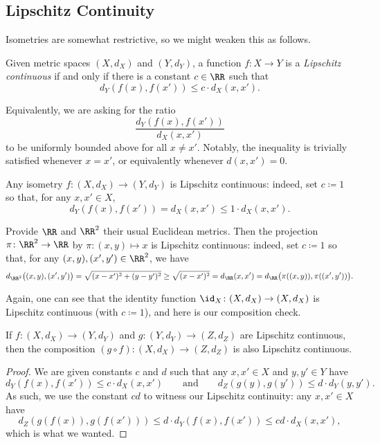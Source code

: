 \documentclass[../notes.tex]{subfiles}
\begin{document}
\subsection{Lipschitz Continuity}
Isometries are somewhat restrictive, so we might weaken this as follows.
\begin{defihelper} \label{defi:lipcont} 
	Given metric spaces $(X,d_X)$ and $(Y,d_Y)$, a function $f\colon X\to Y$ is a \textit{Lipschitz continuous} if and only if there is a constant $c\in\RR$ such that
	\[d_Y(f(x),f(x'))\le c\cdot d_X(x,x').\]
\end{defihelper}
\begin{remark} \label{rem:lipasratio}
	Equivalently, we are asking for the ratio
	\[\frac{d_Y(f(x),f(x'))}{d_X(x,x')}\]
	to be uniformly bounded above for all $x\ne x'$. Notably, the inequality is trivially satisfied whenever $x=x'$, or equivalently whenever $d(x,x')=0$.
\end{remark}
\begin{example}
	Any isometry $f\colon(X,d_X)\to(Y,d_Y)$ is Lipschitz continuous: indeed, set $c\coloneqq1$ so that, for any $x,x'\in X$,
	\[d_Y(f(x),f(x'))=d_X(x,x')\le1\cdot d_X(x,x').\]
\end{example}
\begin{example} \label{ex:projectislip}
	Provide $\RR$ and $\RR^2$ their usual Euclidean metrics. Then the projection $\pi\colon\RR^2\to\RR$ by $\pi\colon(x,y)\mapsto x$ is Lipschitz continuous: indeed, set $c\coloneqq1$ so that, for any $(x,y),(x',y')\in\RR^2$, we have
	\[d_{\RR^2}\big((x,y),(x',y')\big)=\sqrt{(x-x')^2+(y-y')^2}\ge\sqrt{(x-x')^2}=d_\RR(x,x')=d_\RR\big(\pi((x,y)),\pi((x',y'))\big).\]
\end{example}
Again, one can see that the identity function ${\id_X}\colon(X,d_X)\to(X,d_X)$ is Lipschitz continuous (with $c\coloneqq1$), and here is our composition check.
\begin{lemma}
	If $f\colon(X,d_X)\to(Y,d_Y)$ and $g\colon(Y,d_Y)\to(Z,d_Z)$ are Lipschitz continuous, then the composition $(g\circ f)\colon(X,d_X)\to(Z,d_Z)$ is also Lipschitz continuous.
\end{lemma}
\begin{proof}
	We are given constants $c$ and $d$ such that any $x,x'\in X$ and $y,y'\in Y$ have
	\[d_Y(f(x),f(x'))\le c\cdot d_X(x,x')\qquad\text{and}\qquad d_Z(g(y),g(y'))\le d\cdot d_Y(y,y').\]
	As such, we use the constant $cd$ to witness our Lipschitz continuity: any $x,x'\in X$ have
	\[d_Z(g(f(x)),g(f(x')))\le d\cdot d_Y(f(x),f(x'))\le cd\cdot d_X(x,x'),\]
	which is what we wanted.
\end{proof}
\end{document}
